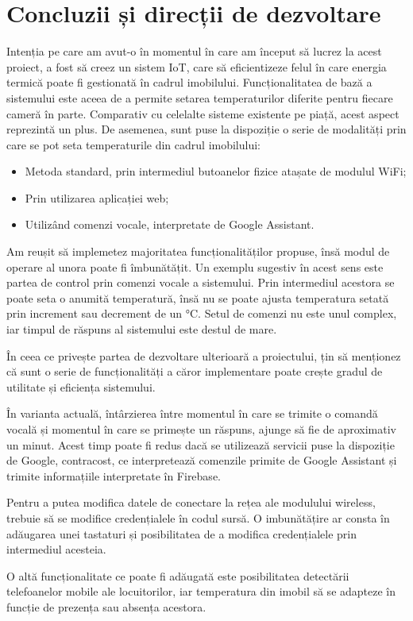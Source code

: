 \chapter{Concluzii și direcții de dezvoltare}\label{ch:6concluzii}

	Intenția pe care am avut-o în momentul în care am început să lucrez la acest proiect, a fost să creez un sistem IoT, care să eficientizeze felul în care energia termică poate fi gestionată în cadrul imobilului. Funcționalitatea de bază a sistemului este aceea de a permite setarea temperaturilor diferite pentru fiecare cameră în parte. Comparativ cu celelalte sisteme existente pe piață, acest aspect reprezintă un plus. De asemenea, sunt puse la dispoziție o serie de modalități prin care se pot seta temperaturile din cadrul imobilului:
	\begin{itemize}
  	\setlength{\itemindent}{2em}
		\itemsep0em
		\item Metoda standard, prin intermediul butoanelor fizice atașate de modulul WiFi;
		\item Prin utilizarea aplicației web;
		\item Utilizând comenzi vocale, interpretate de Google Assistant. 
	\end{itemize} 

\vspace{1em}
	Am reușit să implemetez majoritatea funcționalităților propuse, însă modul de operare al unora poate fi îmbunătățit. Un exemplu sugestiv în acest sens este partea de control prin comenzi vocale a sistemului. Prin intermediul acestora se poate seta o anumită temperatură, însă nu se poate ajusta temperatura setată prin increment sau decrement de un °C. Setul de comenzi nu este unul complex, iar timpul de răspuns al sistemului este destul de mare. 

\vspace{1em}
	În ceea ce privește partea de dezvoltare ulterioară a proiectului, țin să menționez că sunt o serie de funcționalități a căror implementare poate crește gradul de utilitate și eficiența sistemului.

	În varianta actuală, întârzierea între momentul în care se trimite o comandă vocală și momentul în care se primește un răspuns, ajunge să fie de aproximativ un minut. Acest timp poate fi redus dacă se utilizează servicii puse la dispoziție de Google, contracost, ce interpretează comenzile primite de Google Assistant și trimite informațiile interpretate în Firebase. 

	Pentru a putea modifica datele de conectare la rețea ale modulului wireless, trebuie să se modifice credențialele în codul sursă. O imbunătățire ar consta în adăugarea unei tastaturi și posibilitatea de a modifica credențialele prin intermediul acesteia. 

	O altă funcționalitate ce poate fi adăugată este posibilitatea detectării telefoanelor mobile ale locuitorilor, iar temperatura din imobil să se adapteze în funcție de prezența sau absența acestora.
	  